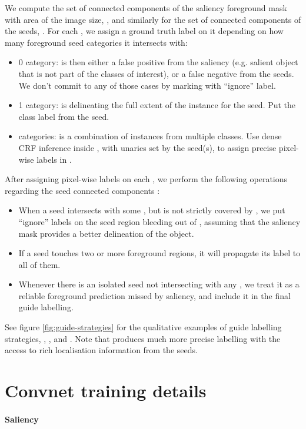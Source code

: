 \documentclass[british,10pt,twocolumn,letterpaper]{article}
\begin{document}
We compute the set of connected components of the saliency foreground
mask with area   of the image size, ,
and similarly for the set of connected components of the seeds, .
For each , we assign a ground truth label on it depending
on how many foreground seed categories it intersects with:
\begin{itemize}
\item 0 category:  is then either a false positive from the
saliency (e.g. salient object that is not part of the classes of interest),
or a false negative from the seeds. We don't commit to any of those
cases by marking with ``ignore'' label.
\item 1 category:  is delineating the full extent of the instance
for the seed. Put the class label from the seed.
\item  categories:  is a combination of instances from
multiple classes. Use dense CRF inference inside , with
unaries set by the seed(s), to assign precise pixel-wise labels in
.
\end{itemize}
After assigning pixel-wise labels on each , we perform
the following operations regarding the seed connected components :
\begin{itemize}
\item When a seed  intersects with some , but is
not strictly covered by , we put ``ignore'' labels
on the seed region bleeding out of , assuming that the
saliency mask provides a better delineation of the object.
\item If a seed  touches two or more foreground regions, it
will propagate its label to all of them.
\item Whenever there is an isolated seed  not intersecting with
any , we treat it as a reliable foreground prediction
missed by saliency, and include it in the final guide labelling. 
\end{itemize}

See figure \ref{fig:guide-strategies} for the qualitative examples
of guide labelling strategies, , ,
and . Note that  produces much
more precise labelling with the access to rich localisation information
from the seeds. 

\section{\label{sec:supp-convnet-training}Convnet training details}

\paragraph{Saliency}
\end{document}
